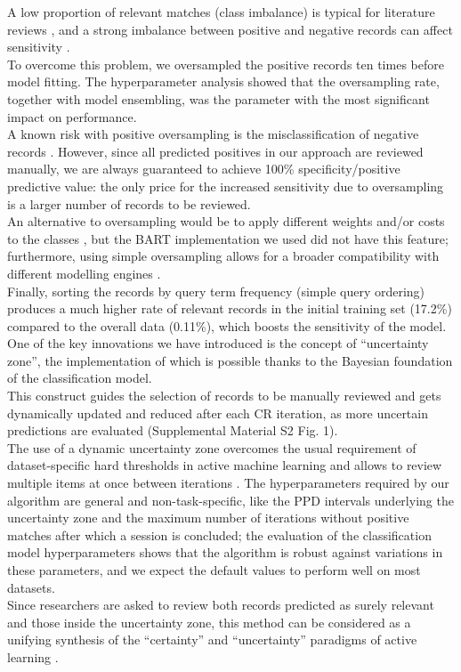 \documentclass[]{bmcart}
\begin{document}
A low proportion of relevant matches (class imbalance) is typical for
literature reviews
\citep{sampson2011precision, wallace2010semi, o2015using}, and a strong
imbalance between positive and negative records can affect sensitivity
\citep{khoshgoftaar2010comparing, chawla2004special}.\\
To overcome this problem, we oversampled \citep{batista2004study} the
positive records ten times before model fitting. The hyperparameter
analysis showed that the oversampling rate, together with model
ensembling, was the parameter with the most significant impact on
performance.\\
A known risk with positive oversampling is the misclassification of
negative records \citep{ramezankhani2016impact}. However, since all
predicted positives in our approach are reviewed manually, we are always
guaranteed to achieve 100\% specificity/positive predictive value: the
only price for the increased sensitivity due to oversampling is a larger
number of records to be reviewed.\\
An alternative to oversampling would be to apply different weights
and/or costs to the classes \citep{abd2013review, diez2015diversity},
but the BART implementation we used did not have this feature;
furthermore, using simple oversampling allows for a broader
compatibility with different modelling engines
\citep{galar2011review, roshan2020improvement}.\\
Finally, sorting the records by query term frequency (simple query
ordering) produces a much higher rate of relevant records in the initial
training set (17.2\%) compared to the overall data (0.11\%), which
boosts the sensitivity of the model.\\

One of the key innovations we have introduced is the concept of
``uncertainty zone'', the implementation of which is possible thanks to
the Bayesian foundation of the classification model.\\
This construct guides the selection of records to be manually reviewed
and gets dynamically updated and reduced after each CR iteration, as
more uncertain predictions are evaluated (Supplemental Material S2 Fig.
1).\\
The use of a dynamic uncertainty zone overcomes the usual requirement of
dataset-specific hard thresholds in active machine learning and allows
to review multiple items at once between iterations
\citep{laws2008stopping, miwa2014reducing, zhu2010confidence}. The
hyperparameters required by our algorithm are general and
non-task-specific, like the PPD intervals underlying the uncertainty
zone and the maximum number of iterations without positive matches after
which a session is concluded; the evaluation of the classification model
hyperparameters shows that the algorithm is robust against variations in
these parameters, and we expect the default values to perform well on
most datasets.\\
Since researchers are asked to review both records predicted as surely
relevant and those inside the uncertainty zone, this method can be
considered as a unifying synthesis of the ``certainty'' and
``uncertainty'' paradigms of active learning \citep{miwa2014reducing}.\\
\end{document}
